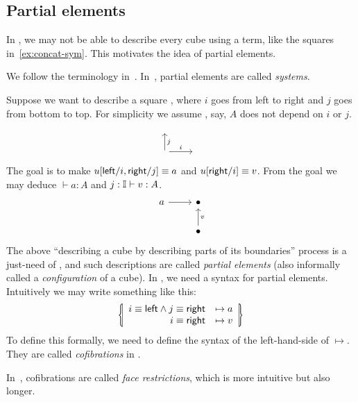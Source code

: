\subsection{Partial elements}\label{sub:partial}
In \CTT, we may not be able to describe every cube using a term,
like the squares in~\cref{ex:concat-sym}.
This motivates the idea of partial elements.
\begin{terminology}
We follow the terminology in~\cite{CubicalAgda}.
In~\cite{CCHM}, partial elements are called \textit{systems}.
\end{terminology}
Suppose we want to describe a square ,
where $i$ goes from left to right and $j$ goes from bottom to top.
For simplicity we assume , say, $A$ does not depend on $i$ or $j$.
\[\begin{tikzcd}
	{} \\
	{} & {}
	\arrow["i", from=2-1, to=2-2]
	\arrow["j"', from=2-1, to=1-1]
\end{tikzcd}\]
The goal is to make $u[\textsf{left}/i, \textsf{right}/j]\equiv a$ and $u[\textsf{right}/i]\equiv v$.
From the goal we may deduce $\vdash a:A$ and $j:\mathbb{I}\vdash v:A$.
\[\begin{tikzcd}
	a & \bullet \\
	& \bullet
	\arrow[from=1-1, to=1-2]
	\arrow["v"', from=2-2, to=1-2]
\end{tikzcd}\]
The above ``describing a cube by describing parts of its boundaries''
process is a just-need of \CTT, and such descriptions are called \textit{partial elements}
(also informally called a \textit{configuration} of a cube).
In \CTT, we need a syntax for partial elements.
Intuitively we may write something like this:
\[\lrbbar{\begin{array}{rc}
  i\equiv\lcon \land j\equiv\rcon&\mapsto a\\
  i\equiv\rcon &\mapsto v
\end{array}}\]
To define this formally, we need to define the syntax of the left-hand-side of $\mapsto$.
They are called \textit{cofibrations} in \CTT.
\begin{terminology}
In~\cite{CCHM}, cofibrations are called \textit{face restrictions},
which is more intuitive but also longer.
\end{terminology}
